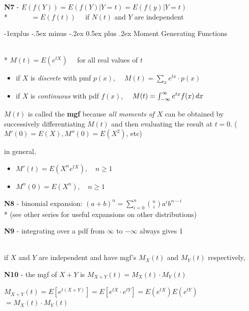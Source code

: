 \documentclass[10pt, landscape]{article}
\makeatletter
\renewcommand{\subsection}{\@startsection{subsection}{2}{0mm}%
  {-1explus -.5ex minus -.2ex}%
  {0.5ex plus .2ex}%
{\normalfont\normalsize\bfseries}}
\makeatother
\begin{document}
\begin{multicols*}{3}
    \textbf{N7} -  $E(f(Y)) = E(f(Y) \vert Y=t) = E(f(y) \vert Y=t)$
    \\*  $\quad\quad\quad = E(f(t)) \quad$ if $N(t)$ and $Y$ are independent

    \subsection{Moment Generating Functions}

    \begin{tightcenter}
      \\* $M(t) = E(e^{tX}) \quad$ for all real values of $t$
    \end{tightcenter}

    \begin{itemize}
      \item if $X$ is \textit{discrete} with pmf $p(x)$, $\quad M(t) = \sum_x e^{tx} \cdot p(x)$ 
      \item if $X$ is \textit{continuous} with pdf $f(x)$, $\quad M(t) = \int^\infty_{-\infty} e^{tx} f(x) \mathop{dx}$
    \end{itemize}

    $M(t)$ is called the  \textbf{mgf} because \textit{all moments of $X$} can be obtained by successively differentiating $M(t)$ and then evaluating the result at $t=0$. ($M'(0) = E(X), M''(0) = E(X^2)$, etc)

    in general, 
    \begin{itemize}
      \item $M'(t) = E(X^n e^{tX}), \quad n \geq 1$ 
      \item $M^n(0) = E(X^n), \quad n \geq 1$
    \end{itemize}

    \textbf{N8} - binomial expansion: $(a+b)^n = \sum\limits^n_{i=0} \binom{n}{i} a^i b^{n-i}$
    \\* (see other series for useful expansions on other distributions)

    \textbf{N9} - integrating over a pdf from $\infty$ to $-\infty$ always gives 1 

    \ 
    \\ if $X$ and $Y$ are independent and have mgf's $M_X(t)$ and $M_Y(t)$ respectively, 

    \textbf{N10} - the mgf of $X+Y$ is $M_{X+Y}(t) = M_X(t) \cdot M_Y(t)$

    \begin{niceproof}
      $M_{X+Y}(t) = E [e^{t(X+Y)}] = E[e^{tX} \cdot e^{tY}] = E(e^{tX}) E(e^{tY})$
      $= M_X(t) \cdot M_Y(t)$
    \end{niceproof}


\end{multicols*}
\end{document}
